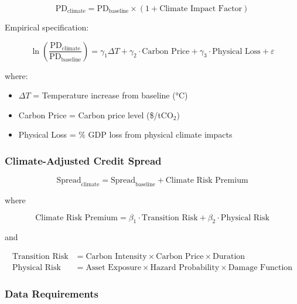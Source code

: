 \documentclass[11pt,a4paper]{article}
\begin{document}
\begin{equation}
\text{PD}_{\text{climate}} = \text{PD}_{\text{baseline}} \times (1 + \text{Climate Impact Factor})
\end{equation}

Empirical specification:

\begin{equation}
\ln\left(\frac{\text{PD}_{\text{climate}}}{\text{PD}_{\text{baseline}}}\right) = \gamma_1 \Delta T + \gamma_2 \cdot \text{Carbon Price} + \gamma_3 \cdot \text{Physical Loss} + \varepsilon
\end{equation}

where:
\begin{itemize}
    \item $\Delta T$ = Temperature increase from baseline (°C)
    \item Carbon Price = Carbon price level (\$/tCO$_2$)
    \item Physical Loss = \% GDP loss from physical climate impacts
\end{itemize}

\subsubsection{Climate-Adjusted Credit Spread}

\begin{equation}
\text{Spread}_{\text{climate}} = \text{Spread}_{\text{baseline}} + \text{Climate Risk Premium}
\end{equation}

where

\begin{equation}
\text{Climate Risk Premium} = \beta_1 \cdot \text{Transition Risk} + \beta_2 \cdot \text{Physical Risk}
\end{equation}

and

\begin{align}
\text{Transition Risk} &= \text{Carbon Intensity} \times \text{Carbon Price} \times \text{Duration}\\
\text{Physical Risk} &= \text{Asset Exposure} \times \text{Hazard Probability} \times \text{Damage Function}
\end{align}

\subsubsection{Data Requirements}
\end{document}
